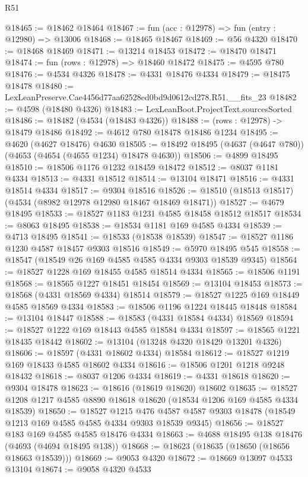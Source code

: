 \begin{lexlean}{R51}
\begin{coremodule}
@18465 := @18462 @18464
@18467 := fun (acc : @12978) => fun (entry : @12980) => @13006
@18468 := @18465 @18467
@18469 := @56 @4320
@18470 := @18468 @18469
@18471 := @13214 @18453
@18472 := @18470 @18471
@18474 := fun (rows : @12978) => @18460 @18472
@18475 := @4595 @780
@18476 := @4534 @4326
@18478 := @4331 @18476 @4334
@18479 := @18475 @18478
@18480 := LexLeanPreserve.Cae4456d77aa62528ed0bd9d0612cd278.R51.__fits_23
@18482 := @4598 (@18480 @4326)
@18483 := LexLeanBoot.ProjectText.sourcesSorted
@18486 := @18482 (@4534 (@18483 @4326))
@18488 := (rows : @12978) -> @18479 @18486
@18492 := @4612 @780 @18478 @18486 @1234
@18495 := @4620 (@4627 @18476) @4630
@18505 := @18492 @18495 (@4637 (@4647 @780)) (@4653 (@4654 (@4655 @1234) @18478 @4630))
@18506 := @4899 @18495
@18510 := @18506 @1176 @1232 @18459 @18472
@18512 := @8037 @1181 @4334
@18513 := @4331 @18512
@18514 := @13104 @18471
@18516 := @4331 @18514 @4334
@18517 := @9304 @18516
@18526 := @18510 (@18513 @18517) (@4534 (@8982 @12978 @12980 @18467 @18469 @18471))
@18527 := @4679 @18495
@18533 := @18527 @1183 @1231 @4585 @18458 @18512 @18517
@18534 := @8063 @18495
@18538 := @18534 @1181 @169 @4585 @4334
@18539 := @4713 @18495
@18541 := @18533 (@18538 @18539)
@18547 := @18527 @1186 @1230 @4587 @18457 @9303 @18516
@18549 := @5970 @18495 @545
@18558 := @18547 (@18549 @26 @169 @4585 @4585 @4334 @9303 @18539 @9345)
@18564 := @18527 @1228 @169 @18455 @4585 @18514 @4334
@18565 := @18506 @1191
@18568 := @18565 @1227 @18451 @18454
@18569 := @13104 @18453
@18573 := @18568 (@4331 @18569 @4334) @18514
@18579 := @18527 @1225 @169 @18449 @4585 @18569 @4334
@18583 := @18506 @1196 @1224 @18445 @18448
@18584 := @13104 @18447
@18588 := @18583 (@4331 @18584 @4334) @18569
@18594 := @18527 @1222 @169 @18443 @4585 @18584 @4334
@18597 := @18565 @1221 @18435 @18442
@18602 := @13104 (@13248 @4320 @18429 @13201 @4326)
@18606 := @18597 (@4331 @18602 @4334) @18584
@18612 := @18527 @1219 @169 @18433 @4585 @18602 @4334
@18616 := @18506 @1201 @1218 @9248 @18432
@18618 := @8037 @1206 @4334
@18619 := @4331 @18618
@18620 := @9304 @18478
@18623 := @18616 (@18619 @18620) @18602
@18635 := @18527 @1208 @1217 @4585 @8890 @18618 @18620 (@18534 @1206 @169 @4585 @4334 @18539)
@18650 := @18527
    @1215
    @476
    @4587
    @4587
    @9303
    @18478
    (@18549 @1213 @169 @4585 @4585 @4334 @9303 @18539 @9345)
@18656 := @18527 @183 @169 @4585 @4585 @18476 @4334
@18663 := @4688 @18495 @138 @18476 (@4693 (@4694 @18495 @138))
@18668 := @18623 (@18635 (@18650 (@18656 @18663 @18539)))
@18669 := @9053 @4320
@18672 := @18669 @13097 @4533 @13104
@18674 := @9058 @4320 @4533

\end{coremodule}
\end{lexlean}
